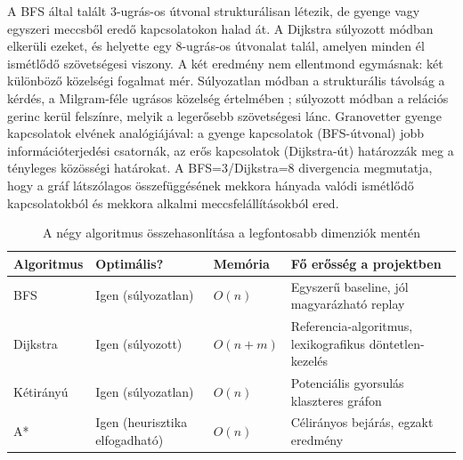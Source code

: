 A BFS által talált 3-ugrás-os útvonal strukturálisan létezik, de gyenge vagy egyszeri meccsből eredő kapcsolatokon halad át. A Dijkstra súlyozott módban elkerüli ezeket, és helyette egy 8-ugrás-os útvonalat talál, amelyen minden él ismétlődő szövetségesi viszony. A két eredmény nem ellentmond egymásnak: két különböző közelségi fogalmat mér. Súlyozatlan módban a strukturális távolság a kérdés, a Milgram-féle ugrásos közelség értelmében \cite{milgram1967}; súlyozott módban a relációs gerinc kerül felszínre, melyik a legerősebb szövetségesi lánc. Granovetter \cite{granovetter1973} gyenge kapcsolatok elvének analógiájával: a gyenge kapcsolatok (BFS-útvonal) jobb információterjedési csatornák, az erős kapcsolatok (Dijkstra-út) határozzák meg a tényleges közösségi határokat. A BFS=3/Dijkstra=8 divergencia megmutatja, hogy a gráf látszólagos összefüggésének mekkora hányada valódi ismétlődő kapcsolatokból és mekkora alkalmi meccsfelállításokból ered.





\begin{table}[H]
\centering
\caption{A négy algoritmus összehasonlítása a legfontosabb dimenziók mentén}
\begin{tabularx}{\textwidth}{>{\raggedright\arraybackslash}p{3cm} >{\raggedright\arraybackslash}p{2.5cm} >{\raggedright\arraybackslash}X >{\raggedright\arraybackslash}X}
\toprule
\textbf{Algoritmus} & \textbf{Optimális?} & \textbf{Memória} & \textbf{Fő erősség a projektben} \\
\midrule
BFS & Igen (súlyozatlan) & $O(n)$ & Egyszerű baseline, jól magyarázható replay \\
Dijkstra & Igen (súlyozott) & $O(n + m)$ & Referencia-algoritmus, lexikografikus döntetlen-kezelés \\
Kétirányú & Igen (súlyozatlan) & $O(n)$ & Potenciális gyorsulás klaszteres gráfon \\
A* & Igen (heurisztika elfogadható) & $O(n)$ & Célirányos bejárás, egzakt eredmény \\
\bottomrule
\end{tabularx}
\end{table}


